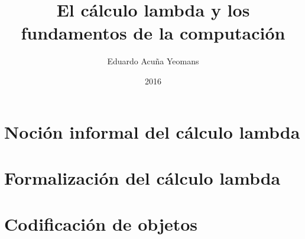 \documentclass[letterpaper,twoside,openright,12pt]{book}
\theoremstyle{plain}%
\theoremstyle{definition}
\theoremstyle{remark}
\begin{document}
\title{El cálculo lambda y los fundamentos de la computación}
\author{Eduardo Acuña Yeomans}
\date{2016}

\maketitle

\frontmatter
\tableofcontents

\mainmatter
\chapter{Noción informal del cálculo lambda}
\label{ch:nocion-informal}


\chapter{Formalización del cálculo lambda}
\label{ch:formalizacion}


\chapter{Codificación de objetos}
\label{ch:codificacion}


\appendix

\nocite{*}


\end{document}
